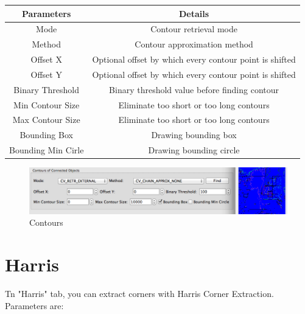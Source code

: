 \documentclass{article}
\begin{document}
\begin{table}[H]
\begin{center}
\begin{tabular}{|c|c|l|l|l|}
\hline
\textbf{Parameters} & \multicolumn{4}{|c|}{\textbf{Details}}                                        \\ \hline
Mode                & \multicolumn{4}{|c|}{Contour retrieval mode}                                  \\ \hline
Method              & \multicolumn{4}{|c|}{Contour approximation method}                            \\ \hline
Offset X            & \multicolumn{4}{|c|}{Optional offset by which every contour point is shifted} \\ \hline
Offset Y            & \multicolumn{4}{|c|}{Optional offset by which every contour point is shifted} \\ \hline
Binary Threshold    & \multicolumn{4}{|c|}{Binary threshold value before finding contour}           \\ \hline
Min Contour Size    & \multicolumn{4}{|c|}{Eliminate too short or too long contours}                \\ \hline
Max Contour Size    & \multicolumn{4}{|c|}{Eliminate too short or too long contours}                \\ \hline
Bounding Box        & \multicolumn{4}{|c|}{Drawing bounding box}                                    \\ \hline
Bounding Min Cirle  & \multicolumn{4}{|c|}{Drawing bounding circle}                                 \\ \hline
\end{tabular}
\end{center}
\end{table}


\begin{figure}[H]
\begin{center}
\includegraphics[scale=0.5]{toolboxContours.png}
\caption{Contours}
\end{center}
\end{figure}	

\section{Harris}
Tn "Harris" tab, you can extract corners with Harris Corner Extraction. Parameters are:
\end{document}
